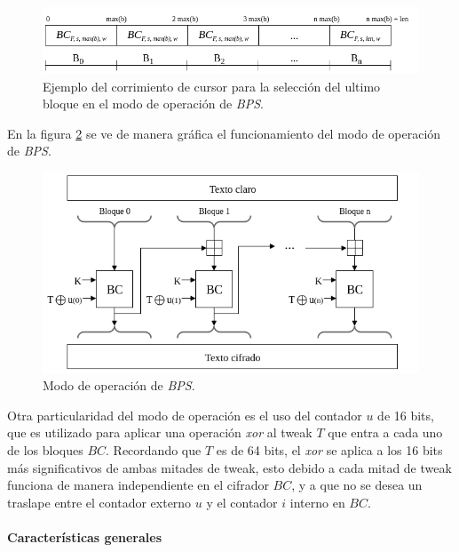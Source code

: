 \begin{figure}[H]
  \begin{center}
    \includegraphics[width=0.5\linewidth]
    {../../../../../diagramas_comunes/bps/cursor_bps}
    \caption{Ejemplo del corrimiento de cursor para la selección del ultimo
      bloque en el modo de operación de \textit{BPS}.}
    \label{cursor_BPS}
   \end{center}
\end{figure}

En la figura \ref{modo_de_operacion_BPS} se ve de manera gráfica el
funcionamiento del modo de operación de \textit{BPS}.

\begin{figure}[H]
  \begin{center}
    \includegraphics[width=0.85\linewidth]
    {../../../../../diagramas_comunes/bps/modo_de_operacion_bps}
    \caption{Modo de operación de \textit{BPS}.}
    \label{modo_de_operacion_BPS}
   \end{center}
\end{figure}

Otra particularidad del modo de operación es el uso del contador $u$ de 16
bits, que es utilizado para aplicar una operación \textit{xor} al tweak $T$
que entra a cada uno de los bloques $BC$. Recordando que $T$ es de 64 bits,
el \textit{xor} se aplica a los 16 bits más significativos de ambas mitades
de tweak, esto debido a cada mitad de tweak funciona de manera independiente
en el cifrador $BC$, y a que no se desea un traslape entre el contador externo
$u$ y el contador $i$ interno en $BC$.


\paragraph{Características generales}

